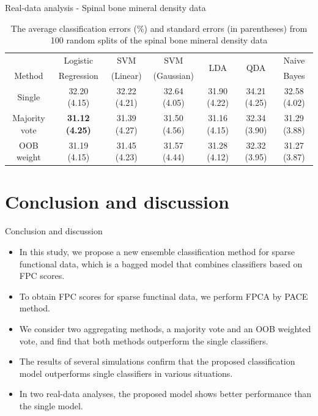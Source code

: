 \documentclass{beamer}
\begin{document}
\begin{frame}{Real-data analysis - Spinal bone mineral density data}
	\begin{table}[ht]
		\footnotesize
		\centering
		\caption{The average classification errors (\%) and standard errors (in parentheses) from 100 random splits of the spinal bone mineral density data}\label{t5}
		\tabcolsep=5pt
		\tiny
		\begin{tabular}{ccccccc}
			\hline \hline
			& Logistic   & SVM      & SVM          &  \multirow{2}{*}{LDA}   &  \multirow{2}{*}{QDA}     & Naive \\
			Method & Regression & (Linear) & (Gaussian) &  &  & Bayes \\ 
			\hline
			Single        & 32.20 (4.15) & 32.22 (4.21) & 32.64 (4.05) & 31.90 (4.22) & 34.21 (4.25) & 32.58 (4.02) \\ 
			Majority vote & \textbf{31.12 (4.25)} & 31.39 (4.27) & 31.50 (4.56) & 31.16 (4.15) & 32.34 (3.90) & 31.29 (3.88) \\ 
			OOB weight    & 31.19 (4.15) & 31.45 (4.23) & 31.57 (4.44) & 31.28 (4.12) & 32.32 (3.95) & 31.27 (3.87) \\
			\hline \hline
		\end{tabular}
	\end{table}
\end{frame}


\section{Conclusion and discussion}

\begin{frame}{Conclusion and discussion}
	\begin{itemize}
		\item{
			In this study, we propose a new ensemble classification method for sparse functional data, which is a bagged model that combines classifiers based on FPC scores.
		}
		\item{
			To obtain FPC scores for sparse functinal data, we perform FPCA by PACE method.
		}
		\item{
			We consider two aggregating methods, a majority vote and an OOB weighted vote, and find that both methods outperform the single classifiers.
		}
		\item{
			The results of several simulations confirm that the proposed classification model outperforms single classifiers in various situations.
		}
		\item{
			In two real-data analyses, the proposed model shows better performance than the single model.
		}
	\end{itemize}
\end{frame}
\end{document}
